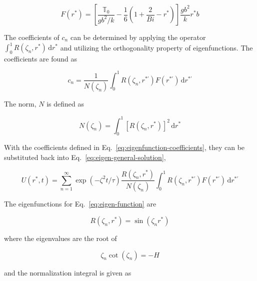 \begin{equation}
    F(r^*) =\left[\frac{\mathbb{T}_0}{gb^2/k} - \frac{1}{6}\left(1 + \frac{2}{Bi} - r^*\right)\right]\frac{gb^2}{k}r^*b 
\end{equation}

The coefficients of $c_n$ can be determined by applying the operator $\int_0^1 R(\zeta_n,r^*)\,\mathrm{d}r^*$ and utilizing the orthogonality property of eigenfunctions. The coefficients are found as

\begin{equation}\label{eq:eigenfunction-coefficients}
    c_n = \frac{1}{N(\zeta_n)}\int_0^1 R(\zeta_n,r^{*'})F(r^{*'})\,\mathrm{d}r^{*'}
\end{equation}

The norm, $N$ is defined as

\begin{equation}
    N(\zeta_n) = \int_0^1 \left[R(\zeta_n,r^*)\right]^2\,\mathrm{d}r^*
\end{equation}

With the coefficients defined in Eq.~\ref{eq:eigenfunction-coefficients}, they can be substituted back into Eq.~\ref{eq:eigen-general-solution},

\begin{equation}
    U(r^*,t) = \sum_{n=1}^\infty \exp(-\zeta^2 t/\tau) \frac{R(\zeta_n,r^*)}{N(\zeta_n)}\int_0^1 R(\zeta_n,r^{*'})F(r^{*'})\,\mathrm{d}r^{*'}
\end{equation}



The eigenfunctions for Eq.~\ref{eq:eigen-function} are

\begin{equation}
    R(\zeta_n,r^*) = \sin(\zeta_n r^*)
\end{equation}

where the eigenvalues are the root of

\begin{equation}
    \zeta_n\cot(\zeta_n) = -H
\end{equation}

and the normalization integral is given as

